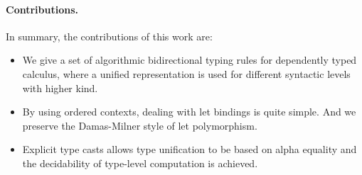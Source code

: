 \paragraph{Contributions.} In summary, the contributions of this work are:
\begin{itemize}
\item We give a set of algorithmic bidirectional typing rules for dependently typed calculus, where a unified representation is used for different syntactic levels with higher kind.
\item By using ordered contexts, dealing with let bindings is quite simple. And we preserve the Damas-Milner style of let polymorphism.
\item Explicit type casts allows type unification to be based on alpha equality and the decidability of type-level computation is achieved.
\end{itemize}
